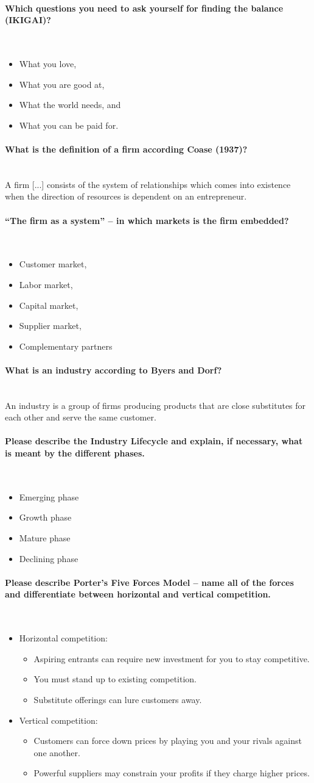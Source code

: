 \documentclass[10pt,a4paper,noendnumber=true]{scrartcl}
\newcommand{\properparagraph}[1]{\paragraph{\textcolor{Emerald}{#1}}\mbox{}\\}
\begin{document}
\properparagraph{Which questions you need to ask yourself for finding the balance (IKIGAI)?}
\begin{itemize}
	\item What you love,
	\item What you are good at,
	\item What the world needs, and
	\item What you can be paid for.
\end{itemize}

\properparagraph{What is the definition of a firm according Coase (1937)?}
A firm [...] consists of the system of relationships which comes into existence when the direction of resources is dependent on an entrepreneur.

\properparagraph{“The firm as a system” – in which markets is the firm embedded?}
\begin{itemize}
	\item Customer market,
	\item Labor market,
	\item Capital market,
	\item Supplier market,
	\item Complementary partners
\end{itemize}

\properparagraph{What is an industry according to Byers and Dorf?}
An industry is a group of firms producing products that are close substitutes for each other and serve the same customer.

\properparagraph{Please describe the Industry Lifecycle and explain, if necessary, what is meant by the different phases.}
\begin{itemize}
	\item Emerging phase
	\item Growth phase
	\item Mature phase
	\item Declining phase
\end{itemize}


\properparagraph{Please describe Porter’s Five Forces Model – name all of the forces and differentiate between horizontal and vertical competition.}
\begin{itemize}
	\item Horizontal competition:
	\begin{itemize}
		\item Aspiring entrants can require new investment for you to stay competitive.
		\item You must stand up to existing competition.
		\item Substitute offerings can lure customers away.
	\end{itemize}
	\item Vertical competition:
	\begin{itemize}
		\item Customers can force down prices by playing you and your rivals against one another.
		\item Powerful suppliers may constrain your profits if they charge higher prices.	
	\end{itemize}
\end{itemize}
\end{document}
